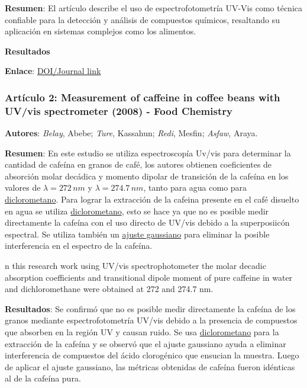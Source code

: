 \documentclass{article}
\begin{document}
\textbf{Resumen}: El artículo describe el uso de espectrofotometría UV-Vis como técnica confiable para la detección y análisis de compuestos químicos, resaltando su aplicación en sistemas complejos como los alimentos. \vspace{0.5cm}

\textbf{Resultados} \vspace{0.5cm}

\textbf{Enlace}: \href{https://doi.org/xxxxxx}{DOI/Journal link} \vspace{0.5cm}

\subsubsection{\textbf{Artículo 2:} \textcolor{trueblue}{\textbf{Measurement of caffeine in coffee beans with UV/vis spectrometer (2008) - Food Chemistry}}} \vspace{0.5cm}

\textbf{Autores}: \textit{Belay}, Abebe; \textit{Ture}, Kassahun; \textit{Redi}, Mesfin; \textit{Asfaw}, Araya. \vspace{0.5cm}


\textbf{Resumen}: En este estudio se utiliza espectroscopía Uv/vis para determinar la cantidad de cafeína en granos de café, los autores obtienen coeficientes de absorción molar decádica y momento dipolar de transición de la cafeína en los valores de $\lambda = 272 \, nm$ y $\lambda = 274.7 \, nm$, tanto para agua como para \underline{diclorometano}. Para lograr la extracción de la cafeina presente en el café disuelto en agua se utiliza \underline{diclorometano}, esto se hace ya que no es posible medir directamente la cafeína con el uso directo de UV/vis debido a la superposiicón espectral. Se utiliza también un \underline{ajuste gaussiano} para eliminar la posible interferencia en el espectro de la cafeína. \vspace{0.5cm}

n this research work using UV/vis spectrophotometer the molar decadic absorption coefficients and transitional dipole moment of pure caffeine in water and dichloromethane were obtained at 272 and 274.7 nm.

\textbf{Resultados}: Se confirmó que no es posible medir directamente la cafeína de los granos mediante espectrofotometría UV/vis debido a la presencia de compuestos que absorben en la región UV y causan ruido. Se usa \underline{diclorometano} para la extracción de la cafeína y se observó que el ajuste gaussiano ayuda a eliminar interferencia de compuestos del ácido clorogénico que ensucian la muestra. Luego de aplicar el ajuste gaussiano, las métricas obtenidas de cafeína fueron idénticas al de la cafeína pura. \vspace{0.5cm}
\end{document}
